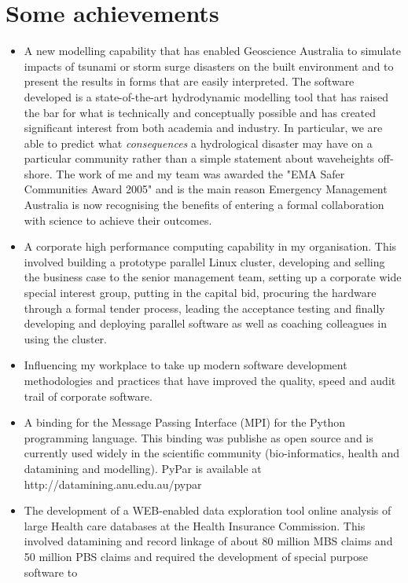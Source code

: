 \documentclass[12pt,a4paper]{article}
\begin{document}
\section*{Some achievements}
\begin{itemize} 
  \item A new modelling capability that has enabled Geoscience Australia to simulate 
  impacts of tsunami or storm surge disasters on the built environment and to present the 
  results in forms that are easily interpreted. The software developed is a 
  state-of-the-art hydrodynamic modelling tool that has raised the bar for what is 
  technically and conceptually possible and has created significant interest from 
  both academia and industry. In particular, we are able to predict what \emph{consequences} a 
  hydrological disaster may have on a particular community rather than a simple statement about 
  waveheights off-shore. The work of me and my team was awarded the "EMA Safer Communities Award 2005" and 
  is the main reason Emergency Management Australia is now recognising the benefits of entering a 
  formal collaboration with science to achieve their outcomes.
  \item A corporate high performance computing capability in my organisation. 
  This involved building a prototype parallel Linux cluster, developing and selling the business case to the 
  senior management team, setting up a corporate wide special interest group, putting in the capital bid, 
  procuring the hardware through a formal tender process, leading the acceptance testing and finally developing and deploying parallel software as well as coaching colleagues in using the cluster.
  \item Influencing my workplace to take up modern software development methodologies and practices that 
  have improved the quality, speed and audit trail of corporate software.
  \item A binding for the Message Passing Interface (MPI) for the Python programming language.
  This binding was publishe as open source and is currently
  used widely in the scientific community (bio-informatics, health and datamining and modelling). 
  PyPar is available at http://datamining.anu.edu.au/pypar
  \item The development of a WEB-enabled 
  data exploration tool online analysis of large Health care databases 
  at the Health Insurance Commission. This involved datamining and record linkage of about 80 million
  MBS claims and 50 million PBS claims and required the development of special purpose software to 

\end{itemize}
\end{document}
